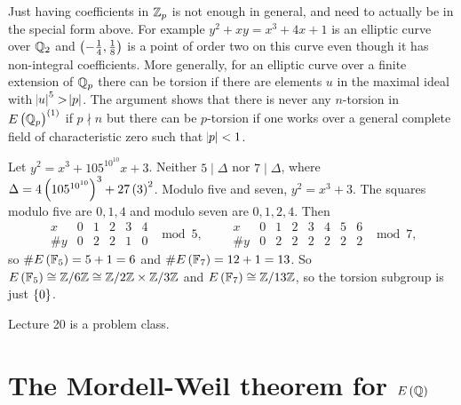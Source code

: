 \begin{remark}
Just having coefficients in $ \mathbb{Z}_p $ is not enough in general, and need to actually be in the special form above. For example $ y^2 + xy = x^3 + 4x + 1 $ is an elliptic curve over $ \mathbb{Q}_2 $ and $ \br{-\tfrac{1}{4}, \tfrac{1}{8}} $ is a point of order two on this curve even though it has non-integral coefficients. More generally, for an elliptic curve over a finite extension of $ \mathbb{Q}_p $ there can be torsion if there are elements $ u $ in the maximal ideal with $ \abs{u}^5 > \abs{p} $. The argument shows that there is never any $ n $-torsion in $ E\br{\QQ_p}^{\br{1}} $ if $ p \nmid n $ but there can be $ p $-torsion if one works over a general complete field of characteristic zero such that $ \abs{p} < 1 $.
\end{remark}

\begin{example}
Let $ y^2 = x^3 + 105^{10^{10}}x + 3 $. Neither $ 5 \mid \Delta $ nor $ 7 \mid \Delta $, where $ \Delta = 4\br{105^{10^{10}}}^3 + 27\br{3}^2 $. Modulo five and seven, $ y^2 = x^3 + 3 $. The squares modulo five are $ 0, 1, 4 $ and modulo seven are $ 0, 1, 2, 4 $. Then
$$
\begin{array}{c|c|c|c|c|c}
x & 0 & 1 & 2 & 3 & 4 \\
\hline
\#y & 0 & 2 & 2 & 1 & 0
\end{array}
\mod 5, \qquad
\begin{array}{c|c|c|c|c|c|c|c}
x & 0 & 1 & 2 & 3 & 4 & 5 & 6 \\
\hline
\#y & 0 & 2 & 2 & 2 & 2 & 2 & 2
\end{array}
\mod 7,
$$
so $ \#E\br{\FF_5} = 5 + 1 = 6 $ and $ \#E\br{\FF_7} = 12 + 1 = 13 $. So $ E\br{\FF_5} \cong \ZZ / 6\ZZ \cong \ZZ / 2\ZZ \times \ZZ / 3\ZZ $ and $ E\br{\FF_7} \cong \ZZ / 13\ZZ $, so the torsion subgroup is just $ \cbr{0} $.
\end{example}


Lecture 20 is a problem class.

\pagebreak

\section{The Mordell-Weil theorem for \texorpdfstring{$ E\br{\QQ} $}{E(Q)}}

